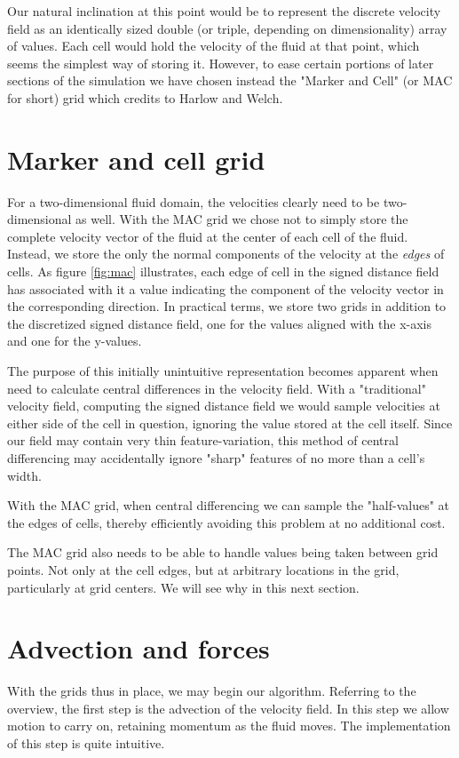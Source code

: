 Our natural inclination at this point would be to represent the
discrete velocity field as an identically sized double (or triple,
depending on dimensionality) array of values. Each cell would hold the
velocity of the fluid at that point, which seems the simplest way of
storing it. However, to ease certain portions of later sections of the
simulation we have chosen instead the "Marker and Cell" (or MAC for
short) grid which  credits to Harlow and Welch.

\section{Marker and cell grid}
For a two-dimensional fluid domain, the velocities clearly need to be
two-dimensional as well. With the MAC grid we chose not to simply
store the complete velocity vector of the fluid at the center of each
cell of the fluid. Instead, we store the only the normal components of
the velocity at the \textit{edges} of cells. As figure \vref{fig:mac} illustrates, each edge of
cell in the signed distance field has associated with it a value
indicating the component of the velocity vector in the corresponding
direction. In practical terms, we store two grids in addition to the
discretized signed distance field, one for the values aligned with the
x-axis and one for the y-values.

The purpose of this initially unintuitive representation becomes
apparent when need to calculate central differences in the velocity
field. With a "traditional" velocity field, computing the signed
distance field we would sample velocities at either side of the cell
in question, ignoring the value stored at the cell itself. Since our
field may contain very thin feature-variation, this method of central
differencing may accidentally ignore "sharp" features of no more than
a cell's width.

With the MAC grid, when central differencing we can sample the
"half-values" at the edges of cells, thereby efficiently avoiding this
problem at no additional cost.

The MAC grid also needs to be able to handle values being taken
between grid points. Not only at the cell edges, but at arbitrary
locations in the grid, particularly at grid centers. We will see why
in this next section.

\section{Advection and forces}
With the grids thus in place, we may begin our algorithm. Referring to
the overview, the first step is the advection of the velocity
field. In this step we allow motion to carry on, retaining momentum as
the fluid moves. The implementation of this step is quite intuitive.

